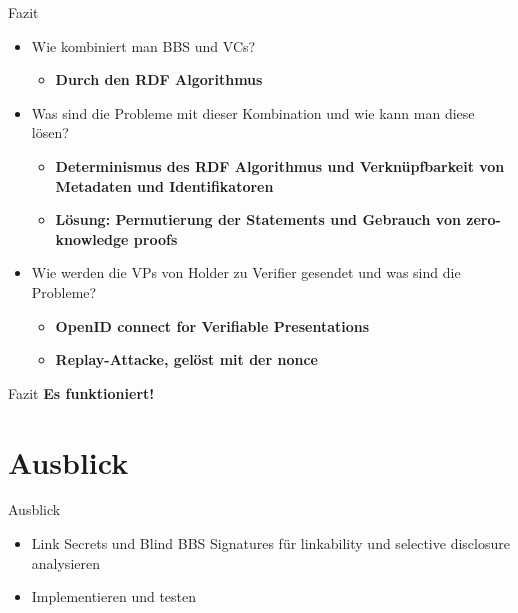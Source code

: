 \documentclass[
	german,%
	authorontitle=true,
	]{bfhbeamer}
\begin{document}
\begin{frame}{Fazit}
    \begin{itemize}
        \item Wie kombiniert man BBS und VCs?
        \begin{itemize}
            \item \textbf{Durch den RDF Algorithmus}
        \end{itemize}
        \item Was sind die Probleme mit dieser Kombination und wie kann man diese lösen?
        \begin{itemize}
            \item \textbf{Determinismus des RDF Algorithmus und Verknüpfbarkeit von Metadaten und Identifikatoren}
            \item \textbf{Lösung: Permutierung der Statements und Gebrauch von zero-knowledge proofs}
        \end{itemize}
        \item Wie werden die VPs von Holder zu Verifier gesendet und was sind die Probleme?
        \begin{itemize}
            \item \textbf{OpenID connect for Verifiable Presentations}
            \item \textbf{Replay-Attacke, gelöst mit der nonce}
        \end{itemize}
    \end{itemize}
\end{frame}

\begin{frame}{Fazit}
    \centering
    \textbf{\huge Es funktioniert!}
\end{frame}

\section{Ausblick}

\begin{frame}{Ausblick}
    \begin{itemize}
        \item Link Secrets und Blind BBS Signatures für linkability und selective disclosure analysieren
        \item Implementieren und testen
    \end{itemize}
\end{frame}
\end{document}
